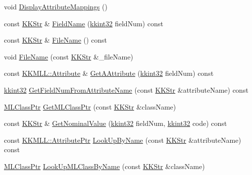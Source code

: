 \begin{DoxyCompactItemize}
\item 
void \hyperlink{class_k_k_m_l_l_1_1_file_desc_ac164c90ac3f6e2391921ea9f359ebdfd}{Display\+Attribute\+Mappings} ()
\item 
const \hyperlink{class_k_k_b_1_1_k_k_str}{K\+K\+Str} \& \hyperlink{class_k_k_m_l_l_1_1_file_desc_a703b2f8283fc0cd4dfbf03308a9d0938}{Field\+Name} (\hyperlink{namespace_k_k_b_a8fa4952cc84fda1de4bec1fbdd8d5b1b}{kkint32} field\+Num) const 
\item 
const \hyperlink{class_k_k_b_1_1_k_k_str}{K\+K\+Str} \& \hyperlink{class_k_k_m_l_l_1_1_file_desc_a5b4f2ac77be5c0d49cbd94eeb463cfed}{File\+Name} () const 
\item 
void \hyperlink{class_k_k_m_l_l_1_1_file_desc_a389d87fe0cf2f2ec04142ef3638a567d}{File\+Name} (const \hyperlink{class_k_k_b_1_1_k_k_str}{K\+K\+Str} \&\+\_\+file\+Name)
\item 
const \hyperlink{class_k_k_m_l_l_1_1_attribute}{K\+K\+M\+L\+L\+::\+Attribute} \& \hyperlink{class_k_k_m_l_l_1_1_file_desc_a3434345c7dff811c0414b20ea9213519}{Get\+A\+Attribute} (\hyperlink{namespace_k_k_b_a8fa4952cc84fda1de4bec1fbdd8d5b1b}{kkint32} field\+Num) const 
\item 
\hyperlink{namespace_k_k_b_a8fa4952cc84fda1de4bec1fbdd8d5b1b}{kkint32} \hyperlink{class_k_k_m_l_l_1_1_file_desc_aeb37e7e22e8ae0bb37f6f7c39eefbdfa}{Get\+Field\+Num\+From\+Attribute\+Name} (const \hyperlink{class_k_k_b_1_1_k_k_str}{K\+K\+Str} \&attribute\+Name) const 
\item 
\hyperlink{namespace_k_k_m_l_l_ac272393853d59e72e8456f14cd6d8c23}{M\+L\+Class\+Ptr} \hyperlink{class_k_k_m_l_l_1_1_file_desc_abfc37cc4ed89d20016c167b38df990a1}{Get\+M\+L\+Class\+Ptr} (const \hyperlink{class_k_k_b_1_1_k_k_str}{K\+K\+Str} \&class\+Name)
\item 
const \hyperlink{class_k_k_b_1_1_k_k_str}{K\+K\+Str} \& \hyperlink{class_k_k_m_l_l_1_1_file_desc_a732930fe4786f35e1b9428c90c05d61c}{Get\+Nominal\+Value} (\hyperlink{namespace_k_k_b_a8fa4952cc84fda1de4bec1fbdd8d5b1b}{kkint32} field\+Num, \hyperlink{namespace_k_k_b_a8fa4952cc84fda1de4bec1fbdd8d5b1b}{kkint32} code) const 
\item 
const \hyperlink{namespace_k_k_m_l_l_a7bf3ea66cacd9dddc58369800cbc93b6}{K\+K\+M\+L\+L\+::\+Attribute\+Ptr} \hyperlink{class_k_k_m_l_l_1_1_file_desc_aa7c35cd4596c3b23ab8c0365df25e141}{Look\+Up\+By\+Name} (const \hyperlink{class_k_k_b_1_1_k_k_str}{K\+K\+Str} \&attribute\+Name) const 
\item 
\hyperlink{namespace_k_k_m_l_l_ac272393853d59e72e8456f14cd6d8c23}{M\+L\+Class\+Ptr} \hyperlink{class_k_k_m_l_l_1_1_file_desc_a69d8dc46e426180993f75ca3b0abcc96}{Look\+Up\+M\+L\+Class\+By\+Name} (const \hyperlink{class_k_k_b_1_1_k_k_str}{K\+K\+Str} \&class\+Name)

\end{DoxyCompactItemize}
